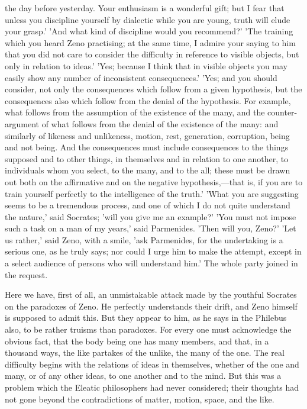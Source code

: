\documentclass[11pt,letter]{article}
\begin{document}
the day before yesterday. Your enthusiasm is a wonderful gift; but I fear that unless you discipline yourself by dialectic while you are young, truth will elude your grasp.' 'And what kind of discipline would you recommend?' 'The training which you heard Zeno practising; at the same time, I admire your saying to him that you did not care to consider the difficulty in reference to visible objects, but only in relation to ideas.' 'Yes; because I think that in visible objects you may easily show any number of inconsistent consequences.' 'Yes; and you should consider, not only the consequences which follow from a given hypothesis, but the consequences also which follow from the denial of the hypothesis. For example, what follows from the assumption of the existence of the many, and the counter-argument of what follows from the denial of the existence of the many: and similarly of likeness and unlikeness, motion, rest, generation, corruption, being and not being. And the consequences must include consequences to the things supposed and to other things, in themselves and in relation to one another, to individuals whom you select, to the many, and to the all; these must be drawn out both on the affirmative and on the negative hypothesis,—that is, if you are to train yourself perfectly to the intelligence of the truth.' 'What you are suggesting seems to be a tremendous process, and one of which I do not quite understand the nature,' said Socrates; 'will you give me an example?' 'You must not impose such a task on a man of my years,' said Parmenides. 'Then will you, Zeno?' 'Let us rather,' said Zeno, with a smile, 'ask Parmenides, for the undertaking is a serious one, as he truly says; nor could I urge him to make the attempt, except in a select audience of persons who will understand him.' The whole party joined in the request.

\par  Here we have, first of all, an unmistakable attack made by the youthful Socrates on the paradoxes of Zeno. He perfectly understands their drift, and Zeno himself is supposed to admit this. But they appear to him, as he says in the Philebus also, to be rather truisms than paradoxes. For every one must acknowledge the obvious fact, that the body being one has many members, and that, in a thousand ways, the like partakes of the unlike, the many of the one. The real difficulty begins with the relations of ideas in themselves, whether of the one and many, or of any other ideas, to one another and to the mind. But this was a problem which the Eleatic philosophers had never considered; their thoughts had not gone beyond the contradictions of matter, motion, space, and the like.
\end{document}
